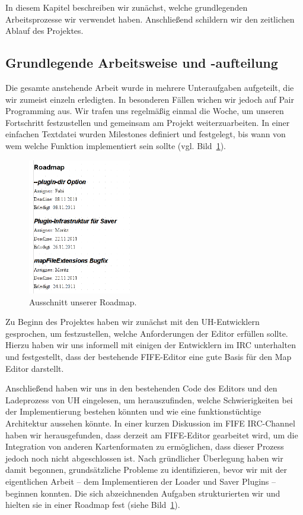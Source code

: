 In diesem Kapitel beschreiben wir zunächst, welche grundlegenden Arbeitsprozesse
wir verwendet haben. Anschließend schildern wir den zeitlichen Ablauf des
Projektes.

\subsection{Grundlegende Arbeitsweise und -aufteilung}
Die gesamte anstehende Arbeit wurde in mehrere Unteraufgaben aufgeteilt, die wir
zumeist einzeln erledigten.
In besonderen Fällen wichen wir jedoch auf Pair Programming aus. Wir trafen uns
regelmäßig einmal die Woche, um unseren Fortschritt festzustellen und gemeinsam
am Projekt weiterzuarbeiten. In einer einfachen Textdatei wurden Milestones
definiert und festgelegt, bis wann von wem welche Funktion implementiert sein
sollte (vgl. Bild~\ref{figure:assignee}).

\begin{figure}[htbp]
  \centering

    \includegraphics[width=0.4\textwidth]{gfx/assignee.png}

  \caption{Ausschnitt unserer Roadmap.}
  \label{figure:assignee}
\end{figure}

Zu Beginn des Projektes haben wir zunächst mit den UH-Entwicklern gesprochen,
um festzustellen, welche Anforderungen der Editor erfüllen sollte. Hierzu
haben wir uns informell mit einigen der Entwicklern im IRC unterhalten und
festgestellt, dass der bestehende FIFE-Editor eine gute Basis für den Map
Editor darstellt.

Anschließend haben wir uns in den bestehenden Code des Editors und den
Ladeprozess von UH eingelesen, um herauszufinden, welche Schwierigkeiten bei der
Implementierung bestehen könnten und wie eine funktionstüchtige Architektur
aussehen könnte.
In einer kurzen Diskussion im FIFE IRC-Channel haben wir herausgefunden, dass
derzeit am FIFE-Editor gearbeitet wird, um die Integration von anderen
Kartenformaten zu ermöglichen, dass dieser Prozess jedoch noch nicht
abgeschlossen ist. Nach gründlicher Überlegung haben wir damit begonnen,
grundsätzliche Probleme zu identifizieren, bevor wir mit der eigentlichen Arbeit
-- dem Implementieren der Loader und Saver Plugins -- beginnen konnten. Die sich
abzeichnenden Aufgaben strukturierten wir und hielten sie in einer Roadmap fest
(siehe Bild~\ref{figure:assignee}).

